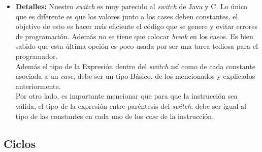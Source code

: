 \documentclass[11pt, spanish]{report}
\begin{document}
\begin{itemize}
\begin{itemize}
  \item \textbf{Detalles:}    
    Nuestro \emph{switch} es muy parecido al \emph{switch} de Java y C. Lo \'unico que es diferente es que los valores junto a los cases deben constantes, el objetivo de esto es hacer m\'as eficiente el c\'odigo que se genere y evitar errores de programaci\'on. Adem\'as no se tiene que colocar \emph{break} en los casos. Es bien sabido que esta \'ultima opci\'on es poco usada por ser una tarea tediosa para el programador.\\

    Adem\'as el tipo de la Expresi\'on dentro del \emph{switch} as\'i como de cada constante asociada a un \emph{case}, debe ser un tipo B\'asico, de los mencionados y explicados anteriormente.\\

    Por otro lado, es importante mencionar que para que la instrucci\'on sea v\'alida, el tipo de la expresi\'on entre par\'entesis del \emph{switch}, debe ser igual al 
    tipo de las constantes en cada uno de los \emph{case} de la instrucci\'on.\\
  \end{itemize}
\end{itemize}

\subsection{Ciclos}
\end{document}
